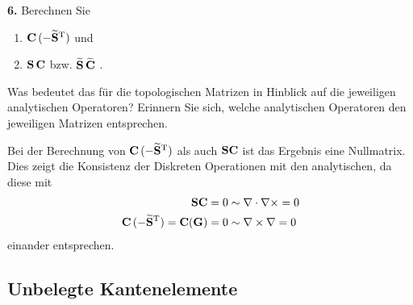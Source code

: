 \documentclass[Protokollheft.tex]{subfiles}
\begin{document}
   \begin{framed}
	\noindent \textbf{6.} Berechnen Sie
                    \begin{enumerate}
                        \item $\mathbf{C}\, (-\widetilde{\mathbf{S}}^{\text{T}})$ und
                        \item $\mathbf{S}\, \mathbf{C}$ bzw. $\widetilde{\mathbf{S}}\, \widetilde{\mathbf{C}}$ \; .
                    \end{enumerate}
                    Was bedeutet das für die topologischen Matrizen in Hinblick
                    auf die jeweiligen analytischen Operatoren? Erinnern Sie sich, welche analytischen Operatoren den jeweiligen Matrizen entsprechen.\label{exer:CG_SC}
\end{framed}
\noindent
Bei der Berechnung von $\mathbf{C}\, (-\widetilde{\mathbf{S}}^{\text{T}})$ als auch $\mathbf{S}\mathbf{C}$ ist das Ergebnis eine Nullmatrix. Dies zeigt die Konsistenz der Diskreten Operationen mit den analytischen, da diese mit
\begin{align*}
	\mathbf{S}\mathbf{C} = 0  &\sim  \nabla \cdot \nabla \times = 0\\
	\mathbf{C}\, (-\widetilde{\mathbf{S}}^{\text{T}})=\mathbf{C}(\mathbf{G}) = 0 &\sim  \nabla \times \nabla	= 0
\end{align*}
einander entsprechen. 
{\subsection{Unbelegte Kantenelemente}}
\end{document}
